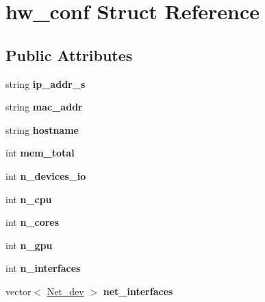 \hypertarget{structhw__conf}{}\section{hw\+\_\+conf Struct Reference}
\label{structhw__conf}
\subsection*{Public Attributes}
\begin{DoxyCompactItemize}
\item 
\mbox{\label{structhw__conf_aa8fe94be900f452c905b18bcde7b0760}} 
string {\bfseries ip\+\_\+addr\+\_\+s}
\item 
\mbox{\label{structhw__conf_a454032efe63c9db0e88e45613d98fe1f}} 
string {\bfseries mac\+\_\+addr}
\item 
\mbox{\label{structhw__conf_ac7056db94fde843eb9beee7ff5fa97a9}} 
string {\bfseries hostname}
\item 
\mbox{\label{structhw__conf_ac3440a27a3673fd44571dfd53f9cbb01}} 
int {\bfseries mem\+\_\+total}
\item 
\mbox{\label{structhw__conf_a60ee1dcc4eb15006b4239e45cff9713c}} 
int {\bfseries n\+\_\+devices\+\_\+io}
\item 
\mbox{\label{structhw__conf_ab5ac3c9df284edd004a56c3a8b833b5f}} 
int {\bfseries n\+\_\+cpu}
\item 
\mbox{\label{structhw__conf_a3bae0770c1c674435cc2577d2c259707}} 
int {\bfseries n\+\_\+cores}
\item 
\mbox{\label{structhw__conf_a4e586796bd85fea66e0d6b57d62632a3}} 
int {\bfseries n\+\_\+gpu}
\item 
\mbox{\label{structhw__conf_a8030eb2bb3a4e5f4ac2d7380c5ba3bd2}} 
int {\bfseries n\+\_\+interfaces}
\item 
\mbox{\label{structhw__conf_a3bf7ec1f9b269acf967f32a89de0dbc3}} 
vector$<$ \mbox{\hyperlink{structnet__dev}{Net\+\_\+dev}} $>$ {\bfseries net\+\_\+interfaces}

\end{DoxyCompactItemize}
